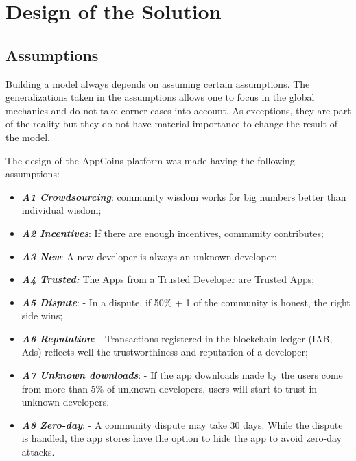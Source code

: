 \section{Design of the Solution}

\label{sec:design}

\subsection{Assumptions}


Building a model always depends on assuming certain assumptions. The generalizations taken in the assumptions allows one to focus in the global mechanics and do not take corner cases into account. As exceptions, they are part of the reality but they do not have material importance to change the result of the model.

The design of the AppCoins platform was made having the following assumptions:

\begin{itemize}
\item {\bf\em A1 Crowdsourcing}: community wisdom works for big numbers better than individual wisdom\cite{Surowiecki:2005:WC:1095645};
\item {\bf\em A2 Incentives}: If there are enough incentives, community contributes;
\item {\bf\em A3 New}: A new developer is always an unknown developer;
\item {\bf\em A4 Trusted:} The Apps from a Trusted Developer are Trusted Apps;
\item {\bf\em A5 Dispute}: - In a dispute, if 50\% + 1 of the community is honest, the right side wins;
\item {\bf\em A6 Reputation}: - Transactions registered in the blockchain ledger (IAB, Ads) reflects well the trustworthiness and reputation of a developer;
\item {\bf\em A7 Unknown downloads}: - If the app downloads made by the users come from more than 5\% of unknown developers, users will start to trust in unknown developers. %
\item {\bf\em A8 Zero-day}: - A community dispute may take 30 days. While the dispute is handled, the app stores have the option to hide the app to avoid zero-day attacks.
\end{itemize}



